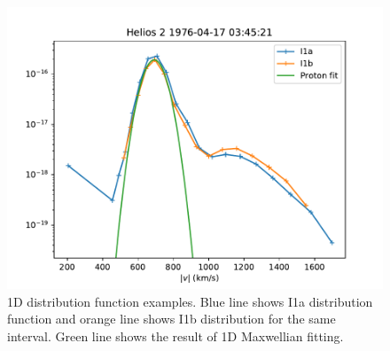 \documentclass[11pt,a4paper]{article}
\begin{document}
\begin{figure}[h]
	\centering
	\includegraphics[width=1\textwidth]{1D_example}
	\caption{1D distribution function examples. Blue line shows I1a distribution function and orange line shows I1b distribution for the same interval. Green line shows the result of 1D Maxwellian fitting.}
	\label{fig:1D}
\end{figure}
\end{document}
